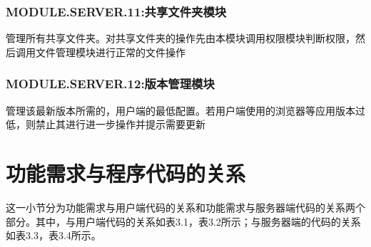 \subsubsection{MODULE.SERVER.11:共享文件夹模块}
管理所有共享文件夹。对共享文件夹的操作先由本模块调用权限模块判断权限，然后调用文件管理模块进行正常的文件操作

\subsubsection{MODULE.SERVER.12:版本管理模块}
管理该最新版本所需的，用户端的最低配置。若用户端使用的浏览器等应用版本过低，则禁止其进行进一步操作并提示需要更新






\section{功能需求与程序代码的关系}
这一小节分为功能需求与用户端代码的关系和功能需求与服务器端代码的关系两个部分。其中，与用户端代码的关系如表3.1，表3.2所示；与服务器端的代码的关系如表3.3，表3.4所示。
